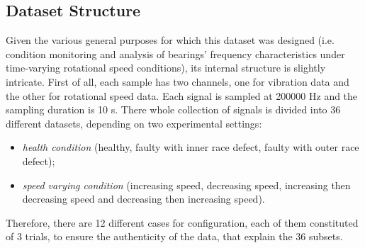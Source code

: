 \documentclass[../main.tex]{subfiles}
\begin{document}
\subsection{Dataset Structure}

Given the various general purposes for which this dataset was designed (i.e. condition monitoring and analysis of bearings' frequency characteristics under time-varying rotational speed conditions), its internal structure is slightly intricate. First of all, each sample has two channels, one for vibration data and the other for rotational speed data. Each signal is sampled at 200000 Hz and the sampling duration is 10 s. There whole collection of signals is divided into 36 different datasets, depending on two experimental settings:
\begin{itemize}
	\item \textit{health condition} (healthy, faulty with inner race defect, faulty with outer race defect);
	\item \textit{speed varying condition} (increasing speed, decreasing speed, increasing then decreasing speed and decreasing then increasing speed).
\end{itemize} 
Therefore, there are 12 different cases for configuration, each of them constituted of 3 trials, to ensure the authenticity of the data, that explain the 36 subsets.


	
\end{document}

